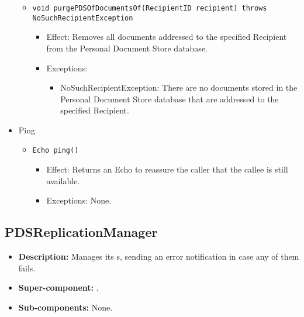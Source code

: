 \begin{itemize}
\begin{itemize}
		\item \texttt{void purgePDSOfDocumentsOf(RecipientID recipient) throws NoSuchRecipientException}
		\begin{itemize}
			\item Effect: Removes all documents addressed to the specified Recipient from the Personal Document Store database.
			\item Exceptions:
			\begin{itemize}
				\item NoSuchRecipientException: There are no documents stored in the Personal Document Store database that are addressed to the specified Recipient.
			\end{itemize}
		\end{itemize}
	\end{itemize}

	\item Ping
	\begin{itemize}
		\item \texttt{Echo ping()}
		\begin{itemize}
			\item Effect: Returns an Echo to reassure the caller that the callee is still available.
			\item Exceptions: None.
		\end{itemize}
	\end{itemize}
\end{itemize}

\subsection{PDSReplicationManager}
\begin{itemize}
    \item \textbf{Description:} Manages its s, sending an error notification in case any of them fails.
    \item \textbf{Super-component:} .
    \item \textbf{Sub-components:} None.
\end{itemize}


